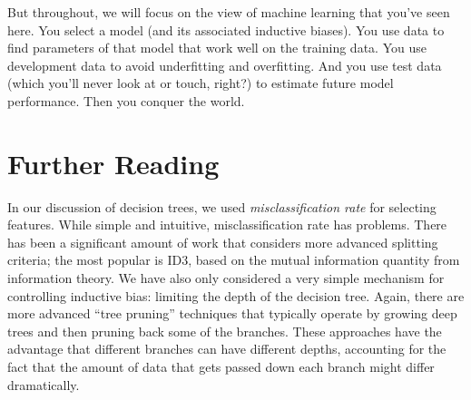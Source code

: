 But throughout, we will focus on the view of machine learning that
you've seen here.  You select a model (and its associated inductive
biases).  You use data to find parameters of that model that work well
on the training data.  You use development data to avoid underfitting
and overfitting.  And you use test data (which you'll never look at or
touch, right?) to estimate future model performance.  Then you conquer
the world.



\section{Further Reading}

In our discussion of decision trees, we used \emph{misclassification rate} for selecting features.
While simple and intuitive, misclassification rate has problems.
There has been a significant amount of work that considers more advanced splitting criteria; the most popular is ID3, based on the mutual information quantity from information theory.
We have also only considered a very simple mechanism for controlling inductive bias: limiting the depth of the decision tree.
Again, there are more advanced ``tree pruning'' techniques that typically operate by growing deep trees and then pruning back some of the branches.
These approaches have the advantage that different branches can have different depths, accounting for the fact that the amount of data that gets passed down each branch might differ dramatically.


\begin{comment}
Predicting the future
 - Not memorizing the past (simple prediction problem)
 - Generalizing from known to unknown
 - Training versus test data

Models, algorithms, theory and experiments

Evaluation

Optimizing 0/1 loss

Underfitting/overfitting by depth

Pruning

From two classes to M classes
\end{comment}


